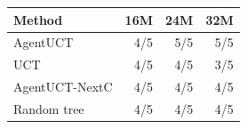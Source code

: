 \begin{tabular}{lrrr}
\toprule
Method & 16M & 24M & 32M\\
\midrule
AgentUCT & 4/5 & 5/5 & 5/5\\
UCT & 4/5 & 4/5 & 3/5\\
AgentUCT-NextC & 4/5 & 4/5 & 4/5\\
Random tree & 4/5 & 4/5 & 4/5\\
\bottomrule
\end{tabular}
